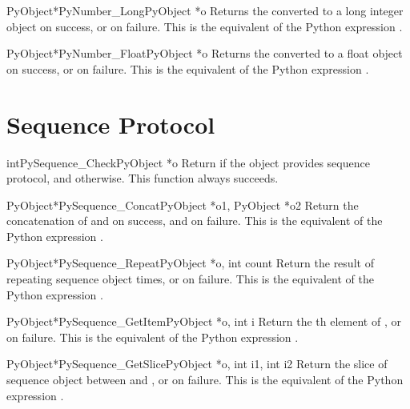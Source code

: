 \documentclass{manual}
\begin{document}
\begin{cfuncdesc}{PyObject*}{PyNumber_Long}{PyObject *o}
Returns the  converted to a long integer object on success,
or \NULL{} on failure.  This is the equivalent of the Python
expression .
\end{cfuncdesc}


\begin{cfuncdesc}{PyObject*}{PyNumber_Float}{PyObject *o}
Returns the  converted to a float object on success, or \NULL{}
on failure.  This is the equivalent of the Python expression
.
\end{cfuncdesc}


\section{Sequence Protocol \label{sequence}}

\begin{cfuncdesc}{int}{PySequence_Check}{PyObject *o}
Return  if the object provides sequence protocol, and 
otherwise.  
This function always succeeds.
\end{cfuncdesc}


\begin{cfuncdesc}{PyObject*}{PySequence_Concat}{PyObject *o1, PyObject *o2}
Return the concatenation of  and  on success, and \NULL{} on
failure.   This is the equivalent of the Python
expression .
\end{cfuncdesc}


\begin{cfuncdesc}{PyObject*}{PySequence_Repeat}{PyObject *o, int count}
Return the result of repeating sequence object  
times, or \NULL{} on failure.  This is the equivalent of the Python
expression .
\end{cfuncdesc}


\begin{cfuncdesc}{PyObject*}{PySequence_GetItem}{PyObject *o, int i}
Return the th element of , or \NULL{} on failure. This
is the equivalent of the Python expression .
\end{cfuncdesc}


\begin{cfuncdesc}{PyObject*}{PySequence_GetSlice}{PyObject *o, int i1, int i2}
Return the slice of sequence object  between  and
, or \NULL{} on failure. This is the equivalent of the Python
expression .
\end{cfuncdesc}
\end{document}
